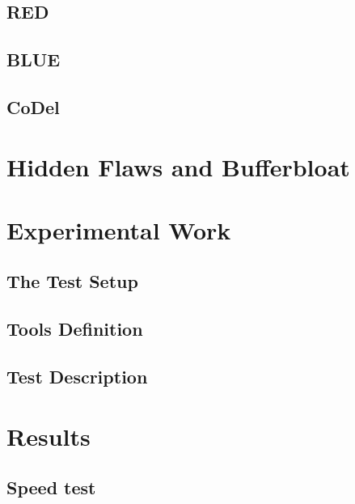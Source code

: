 \documentclass[letter, 11pt]{article}
\theoremstyle{plain}
\theoremstyle{definition}
\begin{document}
\subsection{RED}

\subsection{BLUE}

\subsection{CoDel}


\newpage

\section{Hidden Flaws and Bufferbloat}


\newpage

\section{Experimental Work}


\subsection{The Test Setup}


\subsection{Tools Definition}


\subsection{Test Description}

	
\newpage
\section{Results}


\subsection{Speed test}

\end{document}

